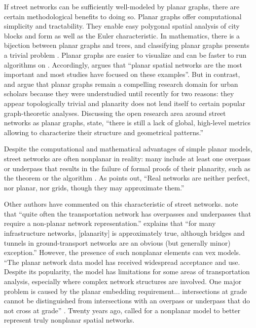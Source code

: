 \documentclass[Afour,sageh,times]{sagej}
\begin{document}
If street networks can be sufficiently well-modeled by planar graphs, there are certain methodological benefits to doing so. Planar graphs offer computational simplicity and tractability. They enable easy polygonal spatial analysis of city blocks and form \citep{fohl_non-planar_1996,barthelemy_paths_2017} as well as the Euler characteristic. In mathematics, there is a bijection between planar graphs and trees, and classifying planar graphs presents a trivial problem \citep{louf_typology_2014}. Planar graphs are easier to visualize and can be faster to run algorithms on \citep{liebers_planarizing_2001}. Accordingly, \citet[p.~3]{barthelemy_spatial_2011} argues that \enquote{planar spatial networks are the most important and most studies have focused on these examples}. But in contrast, \citet{masucci_random_2009} and \citet{masucci_limited_2013} argue that planar graphs remain a compelling research domain for urban scholars because they were understudied until recently for two reasons: they appear topologically trivial and planarity does not lend itself to certain popular graph-theoretic analyses. Discussing the open research area around street networks as planar graphs, \citet[p.~1]{viana_simplicity_2013} state, \enquote{there is still a lack of global, high-level metrics allowing to characterize their structure and geometrical patterns.}

Despite the computational and mathematical advantages of simple planar models, street networks are often nonplanar in reality: many include at least one overpass or underpass that results in the failure of formal proofs of their planarity, such as the \citet{kuratowski_sur_1930} theorem or the \cite{hopcroft_efficient_1974} algorithm \citep[cf.][]{gastner_spatial_2006}. As \citet[p.~7]{levinson_network_2012} points out, \enquote{Real networks are neither perfect, nor planar, nor grids, though they may approximate them.}

Other authors have commented on this characteristic of street networks. \citet[p.~199]{jiang_object-oriented_2010} note that \enquote{quite often the transportation network has overpasses and underpasses that require a non-planar network representation.} \citet[p.~1258]{fischer_spatial_2014} explains that \enquote{for many infrastructure networks, {[planarity]} is approximately true, although bridges and tunnels in ground-transport networks are an obvious (but generally minor) exception.} However, the presence of such nonplanar elements can vex models. \enquote{The planar network data model has received widespread acceptance and use. Despite its popularity, the model has limitations for some areas of transportation analysis, especially where complex network structures are involved. One major problem is caused by the planar embedding requirement... intersections at grade cannot be distinguished from intersections with an overpass or underpass that do not cross at grade} \citep[p.~395]{fischer_gis_2004}. Twenty years ago, \citet[p.~18]{fohl_non-planar_1996} called for a nonplanar model to better represent truly nonplanar spatial networks. 
\end{document}
